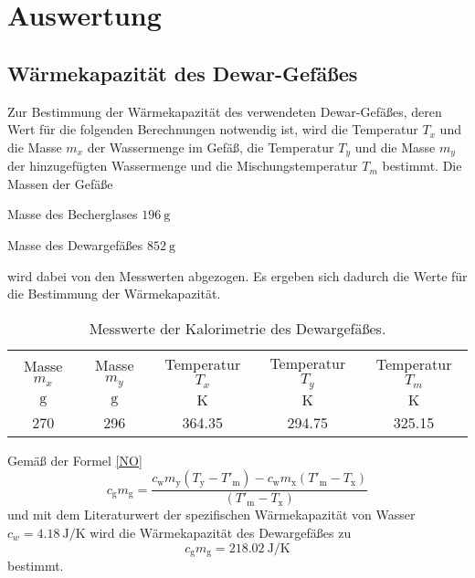\section{Auswertung}
\label{sec:Auswertung}
\subsection{Wärmekapazität des Dewar-Gefäßes}
Zur Bestimmung der Wärmekapazität des verwendeten Dewar-Gefäßes, deren Wert für die folgenden Berechnungen notwendig ist,
wird die Temperatur $T_x$ und die Masse $m_x$ der Wassermenge im Gefäß, die Temperatur $T_y$ und die Masse $m_y$ der hinzugefügten Wassermenge und die Mischungstemperatur $T_m$ bestimmt.
Die Massen der Gefäße 
\begin{description}
	\item{Masse des Becherglases} $\SI{196}{\gram}$
	\item{Masse des Dewargefäßes} $\SI{852}{\gram}$
\end{description}
wird dabei von den Messwerten abgezogen.
Es ergeben sich dadurch die Werte für die Bestimmung der Wärmekapazität.
\begin{table}[h]
	\centering
	\begin{tabular}{ccccc}%
		\toprule
		{Masse $m_x$}& {Masse $m_y$}  &{Temperatur  $T_x$}&{Temperatur $T_y$}  &{Temperatur $T_m$}\\
		{$\si{\gram}$}& {$\si{\gram}$}  &{$\si{\kelvin}$}& {$\si{\kelvin}$}  &{$\si{\kelvin}$}\\
		\midrule
		270 & 296 & 364.35 & 294.75 & 325.15\\
		\bottomrule
	\end{tabular}
	\caption{Messwerte der Kalorimetrie des Dewargefäßes.}
	\label{tab:messung1}
\end{table}
Gemäß der Formel \ref{NO}
\begin{equation}
	c_\mathup{g}m_\mathup{g}=\frac{c_\mathup{w}m_\mathup{y}(T_\mathup{y}-T'_\mathup{m})-c_\mathup{w}m_\mathup{x}(T'_\mathup{m}-T_\mathup{x})}{(T'_\mathup{m}-T_\mathup{x})}
\end{equation}
und mit dem Literaturwert\cite{NO} der spezifischen Wärmekapazität von Wasser $c_w=\SI{4.18}{\joule\per\kelvin}$ wird die Wärmekapazität des Dewargefäßes zu
\begin{equation}
	c_\mathup{g}m_\mathup{g}=\SI{218.02}{\joule\per\kelvin}
	\label{wert:waerme_dewar}
\end{equation}
bestimmt.

